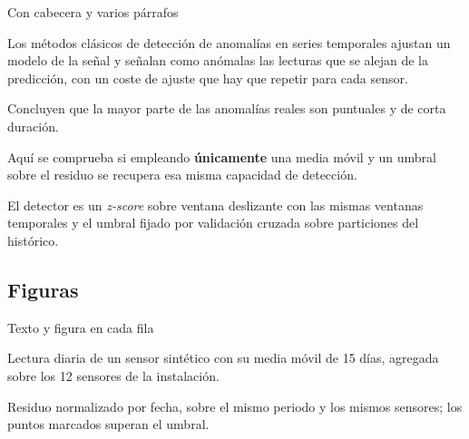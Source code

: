 \documentclass[aspectratio=169,9pt]{beamer}
\begin{document}
\begin{frame}{Con cabecera y varios párrafos}
\begin{tworows}

  Los métodos clásicos de detección de anomalías en series temporales
  ajustan un modelo de la señal y señalan como anómalas las lecturas que se
  alejan de la predicción, con un coste de ajuste que hay que repetir para
  cada sensor.

  Concluyen que la mayor parte de las anomalías reales son puntuales y de
  corta duración.
\nextrow

  Aquí se comprueba si empleando \textbf{únicamente} una media móvil y un
  umbral sobre el residuo se recupera esa misma capacidad de detección.

  El detector es un \emph{z-score} sobre ventana deslizante con las mismas
  ventanas temporales y el umbral fijado por validación cruzada sobre
  particiones del histórico.
\end{tworows}
\end{frame}

\subsection{Figuras}

\begin{frame}{Texto y figura en cada fila}
\begin{tworows}
  \begin{minipage}[t]{0.48\linewidth}\vspace{0pt}\ucmbodysetup
    Lectura diaria de un sensor sintético con su media móvil de 15 días,
    agregada sobre los 12 sensores de la instalación.
  \end{minipage}\hfill
  \begin{minipage}[t]{0.48\linewidth}\vspace{0pt}
  \end{minipage}
\nextrow
  \begin{minipage}[t]{0.48\linewidth}\vspace{0pt}\ucmbodysetup
    Residuo normalizado por fecha, sobre el mismo periodo y los mismos
    sensores; los puntos marcados superan el umbral.
  \end{minipage}\hfill
  \begin{minipage}[t]{0.48\linewidth}\vspace{0pt}
  \end{minipage}
\end{tworows}
\end{frame}
\end{document}
